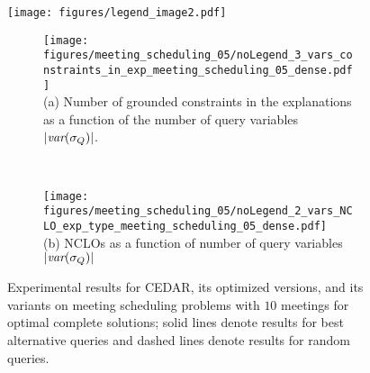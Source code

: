 \documentclass[twoside,11pt]{article}
\begin{document}

\begin{figure}[t]
\centering
\small

\texttt{[image: figures/legend\_image2.pdf]}  %

\begin{subfigure}[t]{1\columnwidth}
\centering
\texttt{[image: figures/meeting\_scheduling\_05/noLegend\_3\_vars\_constraints\_in\_exp\_meeting\_scheduling\_05\_dense.pdf]} \\ 
\vspace{-0.5em} (a) Number of grounded constraints in the explanations as a function of the number of query variables $|{\textit{var}(\sigma_Q)}|$.
\end{subfigure} \\
\begin{subfigure}[t]{1\columnwidth}
\centering
\texttt{[image: figures/meeting\_scheduling\_05/noLegend\_2\_vars\_NCLO\_exp\_type\_meeting\_scheduling\_05\_dense.pdf]} 
\\ 
\vspace{-0.5em} (b) NCLOs as a function of number of query variables $|{\textit{var}(\sigma_Q)}|$
\end{subfigure}

\caption{Experimental results for CEDAR, its optimized versions, and its variants on meeting scheduling problems with $10$ meetings for optimal complete solutions; solid lines denote results for best alternative queries and dashed lines denote results for random queries.}
\label{fig:results}
\end{figure}



\end{document}
